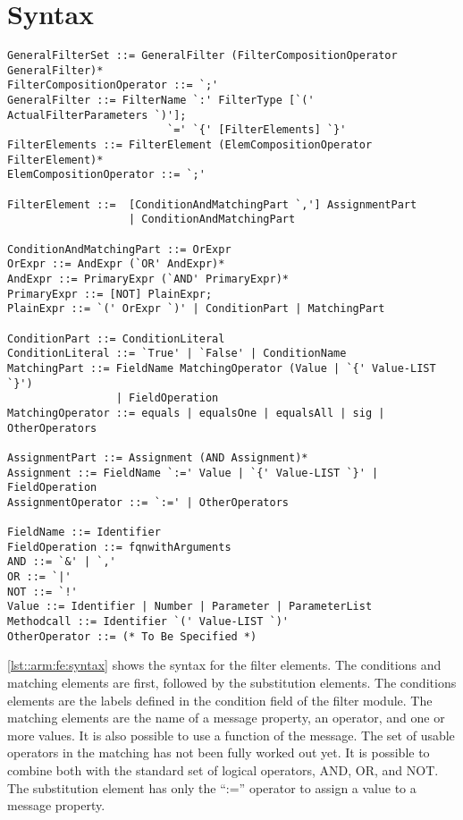 \section*{Syntax}
\begin{lstlisting}[caption = {Filter element syntax},label=lst::arm:fe:syntax,style=listing,language=ebnf, float=tpb]
GeneralFilterSet ::= GeneralFilter (FilterCompositionOperator GeneralFilter)*
FilterCompositionOperator ::= `;'
GeneralFilter ::= FilterName `:' FilterType [`(' ActualFilterParameters `)'];
                         `=' `{' [FilterElements] `}'
FilterElements ::= FilterElement (ElemCompositionOperator FilterElement)*
ElemCompositionOperator ::= `;'

FilterElement ::=  [ConditionAndMatchingPart `,'] AssignmentPart 
                   | ConditionAndMatchingPart

ConditionAndMatchingPart ::= OrExpr
OrExpr ::= AndExpr (`OR' AndExpr)*
AndExpr ::= PrimaryExpr (`AND' PrimaryExpr)*
PrimaryExpr ::= [NOT] PlainExpr;
PlainExpr ::= `(' OrExpr `)' | ConditionPart | MatchingPart

ConditionPart ::= ConditionLiteral
ConditionLiteral ::= `True' | `False' | ConditionName
MatchingPart ::= FieldName MatchingOperator (Value | `{' Value-LIST `}')
                 | FieldOperation
MatchingOperator ::= equals | equalsOne | equalsAll | sig | OtherOperators

AssignmentPart ::= Assignment (AND Assignment)*
Assignment ::= FieldName `:=' Value | `{' Value-LIST `}' | FieldOperation
AssignmentOperator ::= `:=' | OtherOperators

FieldName ::= Identifier
FieldOperation ::= fqnwithArguments
AND ::= `&' | `,'
OR ::= `|'
NOT ::= `!'
Value ::= Identifier | Number | Parameter | ParameterList
Methodcall ::= Identifier `(' Value-LIST `)'
OtherOperator ::= (* To Be Specified *)
\end{lstlisting}
\autoref{lst::arm:fe:syntax} shows the syntax for the filter elements. The conditions and matching elements
are first, followed by the substitution elements. The conditions elements are the labels defined in the condition field of the filter module. The matching elements are the name of a message property, an operator, and one or more values. It is also possible to use a function of the message.
The set of usable operators in the matching has not been fully worked out yet.
It is possible to combine both with the standard set of logical operators, AND, OR, and NOT.
The substitution element has only the ``:='' operator to assign a value to a message property.

